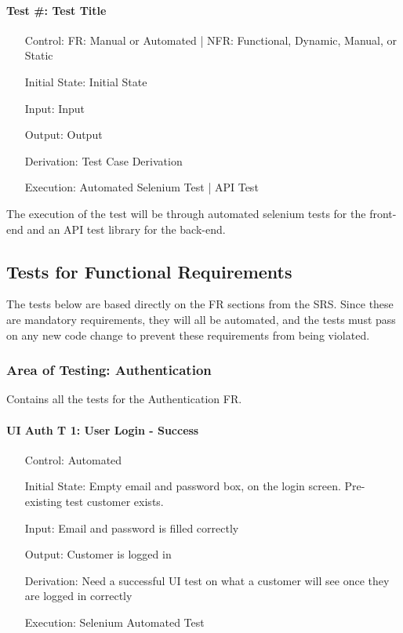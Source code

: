 \documentclass[12pt, titlepage]{article}
\begin{document}
\paragraph*{Test \#{}: Test Title}
\begin{itemize}
	\item[Control:] FR: Manual or Automated | NFR: Functional, Dynamic, Manual, or Static
	\item[Initial State:] Initial State
	\item[Input:] Input
	\item[Output:] Output
	\item[Derivation:] Test Case Derivation
	\item[Execution:] Automated Selenium Test | API Test
\end{itemize}
The execution of the test will be through automated selenium tests for the front-end and an API test library for the back-end.
	
\subsection{Tests for Functional Requirements}
The tests below are based directly on the FR sections from the SRS. Since these are mandatory requirements, they will all be automated, and the tests must pass on any new code change to prevent these requirements from being violated.

\subsubsection{Area of Testing: Authentication}
Contains all the tests for the Authentication FR.

\paragraph*{UI Auth T 1: User Login - Success}
\begin{itemize}
	\item[Control:] Automated
	\item[Initial State:] Empty email and password box, on the login screen. Pre-existing test customer exists. 
	\item[Input:] Email and password is filled correctly
	\item[Output:] Customer is logged in
	\item[Derivation:] Need a successful UI test on what a customer will see once they are logged in correctly
	\item[Execution:] Selenium Automated Test
\end{itemize}
\end{document}
